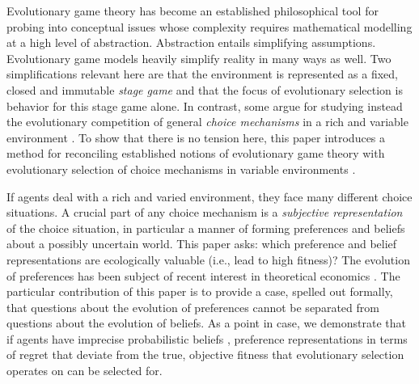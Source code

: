 \documentclass[fleqn,reqno,11pt]{article}
\begin{document}

Evolutionary game theory has become an established philosophical tool for probing into
conceptual issues whose complexity requires mathematical modelling at a high level of
abstraction.  Abstraction entails simplifying assumptions. Evolutionary game models heavily
simplify reality in many ways as well. Two simplifications relevant here are that the
environment is represented as a fixed, closed and immutable \emph{stage game} and that the
focus of evolutionary selection is behavior for this stage game alone. In contrast, some argue
for studying instead the evolutionary competition of general \emph{choice mechanisms} in a rich
and variable environment
\citep[e.g.,][]{FawcettHamblin2013:Exposing-the-be,McNamara2013:Towards-a-Riche}. To show that
there is no tension here, this paper introduces a method for reconciling established notions of
evolutionary game theory with evolutionary selection of choice mechanisms in variable
environments \citep[see related work
by][]{ZollmanSmead2010:Plasticity-and-,SmeadZollman2013:The-Stability-o}.

If agents deal with a rich and varied environment, they face many different choice
situations. A crucial part of any choice mechanism is a \emph{subjective representation} of the
choice situation, in particular a manner of forming preferences and beliefs about a possibly
uncertain world. This paper asks: which preference and belief representations are ecologically
valuable (i.e., lead to high fitness)? The evolution of preferences has been subject of recent
interest in theoretical economics \citep[e.g.,][]{algweib13,DekElyYlan07,RobSam11}. The
particular contribution of this paper is to provide a case, spelled out formally, that
questions about the evolution of preferences cannot be separated from questions about the
evolution of beliefs. As a point in case, we demonstrate that if agents have imprecise
probabilistic beliefs \citep[e.g.][]{gardsah82,levi74,walley96}, preference representations in
terms of regret that deviate from the
true, objective fitness that evolutionary selection operates on can be selected for.

\end{document}
